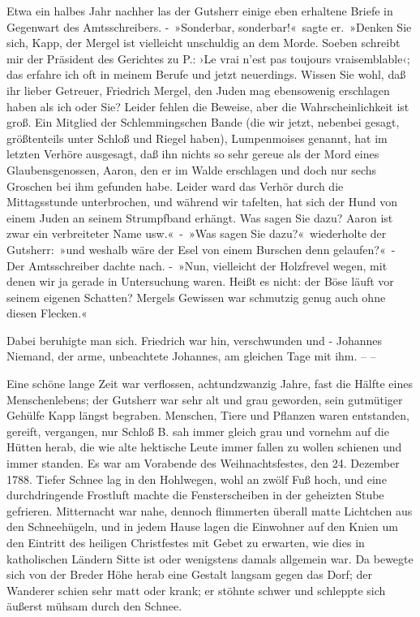 Etwa ein halbes Jahr nachher las der Gutsherr einige eben erhaltene Briefe in Gegenwart des Amtsschreibers. - »Sonderbar, sonderbar!« sagte er. »Denken Sie sich, Kapp, der Mergel ist vielleicht unschuldig an dem Morde. Soeben schreibt mir der Präsident des Gerichtes zu P.: ›Le vrai n’est pas toujours vraisemblable‹; das erfahre ich oft in meinem Berufe und jetzt neuerdings. Wissen Sie wohl, daß ihr lieber Getreuer, Friedrich Mergel, den Juden mag ebensowenig erschlagen haben als ich oder Sie? Leider fehlen die Beweise, aber die Wahrscheinlichkeit ist groß. Ein Mitglied der Schlemmingschen Bande (die wir jetzt, nebenbei gesagt, größtenteils unter Schloß und Riegel haben), Lumpenmoises genannt, hat im letzten Verhöre ausgesagt, daß ihn nichts so sehr gereue als der Mord eines Glaubensgenossen, Aaron, den er im Walde erschlagen und doch nur sechs Groschen bei ihm gefunden habe. Leider ward das Verhör durch die Mittagsstunde unterbrochen, und während wir tafelten, hat sich der Hund von einem Juden an seinem Strumpfband erhängt. Was sagen Sie dazu? Aaron ist zwar ein verbreiteter Name usw.« - »Was sagen Sie dazu?« wiederholte der Gutsherr: »und weshalb wäre der Esel von einem Burschen denn gelaufen?« - Der Amtsschreiber dachte nach. - »Nun, vielleicht der Holzfrevel wegen, mit denen wir ja gerade in Untersuchung waren. Heißt es nicht: der Böse läuft vor seinem eigenen Schatten? Mergels Gewissen war schmutzig genug auch ohne diesen Flecken.«

Dabei beruhigte man sich. Friedrich war hin, verschwunden und - Johannes Niemand, der arme, unbeachtete Johannes, am gleichen Tage mit ihm. – –

Eine schöne lange Zeit war verflossen, achtundzwanzig Jahre, fast die Hälfte eines Menschenlebens; der Gutsherr war sehr alt und grau geworden, sein gutmütiger Gehülfe Kapp längst begraben. Menschen, Tiere und Pflanzen waren entstanden, gereift, vergangen, nur Schloß B. sah immer gleich grau und vornehm auf die Hütten herab, die wie alte hektische Leute immer fallen zu wollen schienen und immer standen. Es war am Vorabende des Weihnachtsfestes, den 24. Dezember 1788. Tiefer Schnee lag in den Hohlwegen, wohl an zwölf Fuß hoch, und eine durchdringende Frostluft machte die Fensterscheiben in der geheizten Stube gefrieren. Mitternacht war nahe, dennoch flimmerten überall matte Lichtchen aus den Schneehügeln, und in jedem Hause lagen die Einwohner auf den Knien um den Eintritt des heiligen Christfestes mit Gebet zu erwarten, wie dies in katholischen Ländern Sitte ist oder wenigstens damals allgemein war. Da bewegte sich von der Breder Höhe herab eine Gestalt langsam gegen das Dorf; der Wanderer schien sehr matt oder krank; er stöhnte schwer und schleppte sich äußerst mühsam durch den Schnee.


